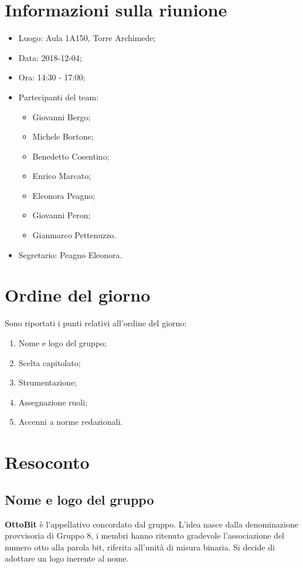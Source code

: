 \documentclass[11pt,a4paper]{article}
\begin{document}
	\section{Informazioni sulla riunione}
	\begin{itemize}
	\item Luogo: Aula 1A150, Torre Archimede;
	\item Data: 2018-12-04;
	\item Ora: 14:30 - 17:00;
	\item Partecipanti del team: 
	\begin{itemize}
		\item Giovanni Bergo;
		\item Michele Bortone;
		\item Benedetto Cosentino;
		\item Enrico Marcato;
		\item Eleonora Peagno;
		\item Giovanni Peron;
		\item Gianmarco Pettenuzzo.
	\end{itemize}
	\item Segretario: Peagno Eleonora.
	\end{itemize}

	\section{Ordine del giorno}
	Sono riportati i punti relativi all'ordine del giorno:
	\begin{enumerate}
	\item Nome e logo del gruppo;
	\item Scelta capitolato;
	\item Strumentazione;
	\item Assegnazione ruoli;
	\item Accenni a norme redazionali.
	\end{enumerate}
	
	\section{Resoconto}	
	\subsection{Nome e logo del gruppo}
	\textbf{OttoBit} è l'appellativo concordato dal gruppo. L'idea nasce dalla denominazione provvisoria di Gruppo 8, i membri hanno ritenuto gradevole l'associazione del numero otto alla parola bit, riferita all'unità di misura binaria. Si decide di adottare un logo inerente al nome.
\end{document}
